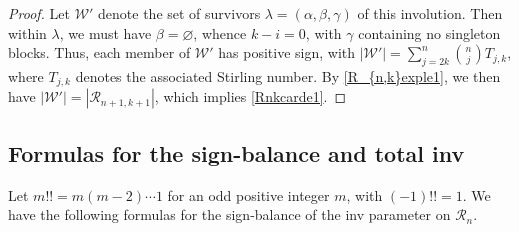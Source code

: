 \documentclass[11pt,a4paper]{article}
\begin{document}
\begin{proof}
Let $\mathcal{W}'$ denote the set of survivors $\lambda=(\alpha,\beta,\gamma)$ of this involution.  Then within $\lambda$, we must have $\beta=\varnothing$, whence $k-i=0$, with $\gamma$ containing no singleton blocks.  Thus, each member of $\mathcal{W}'$ has positive sign, with
$|\mathcal{W}'|=\sum_{j=2k}^n\binom{n}{j}T_{j,k}$, where $T_{j,k}$ denotes the associated Stirling number.  By \eqref{R_{n,k}exple1}, we then have $|\mathcal{W}'|=|\mathcal{R}_{n+1,k+1}|$, which implies \eqref{Rnkcarde1}.
\end{proof}

\subsection{Formulas for the sign-balance and total inv}

 Let $m!!=m(m-2)\cdots 1$ for an odd positive integer $m$, with $(-1)!!=1$.  We have the following formulas for the sign-balance of the inv parameter on $\mathcal{R}_n$.
\end{document}
